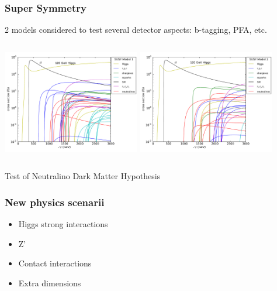 \documentclass{beamer}
\begin{document}
\begin{frame}
\frametitle{Super Symmetry}
2 models considered to test several detector aspects: b-tagging, PFA, etc.
\begin{columns}[c]
\column{6cm}
\includegraphics[width=6cm]{susy_model1}
\column{6cm}
\includegraphics[width=6cm]{susy_model2}
\end{columns}
Test of Neutralino Dark Matter Hypothesis
\end{frame}

\begin{frame}
\frametitle{New physics scenarii}
\begin{itemize}
  \item Higgs strong interactions
  \item Z'
  \item Contact interactions
  \item Extra dimensions
\end{itemize}
\end{frame}
\end{document}
